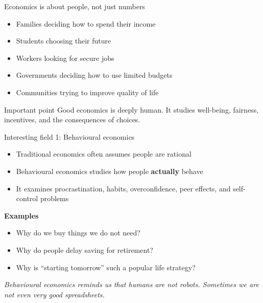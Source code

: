 \documentclass[aspectratio=169,11pt]{beamer}
\begin{document}
\begin{frame}{Economics is about people, not just numbers}
\begin{itemize}
    \item Families deciding how to spend their income
    \item Students choosing their future
    \item Workers looking for secure jobs
    \item Governments deciding how to use limited budgets
    \item Communities trying to improve quality of life
\end{itemize}
\vspace{0.5cm}
\begin{block}{Important point}
Good economics is deeply human. It studies well-being, fairness, incentives, and the consequences of choices.
\end{block}
\end{frame}

\begin{frame}{Interesting field 1: Behavioural economics}
\begin{itemize}
    \item Traditional economics often assumes people are rational
    \item Behavioural economics studies how people \textbf{actually} behave
    \item It examines procrastination, habits, overconfidence, peer effects, and self-control problems
\end{itemize}
\vspace{0.3cm}
\textbf{Examples}
\begin{itemize}
    \item Why do we buy things we do not need?
    \item Why do people delay saving for retirement?
    \item Why is ``starting tomorrow'' such a popular life strategy?
\end{itemize}
\vspace{0.3cm}
\textit{Behavioural economics reminds us that humans are not robots. Sometimes we are not even very good spreadsheets.}
\end{frame}
\end{document}
